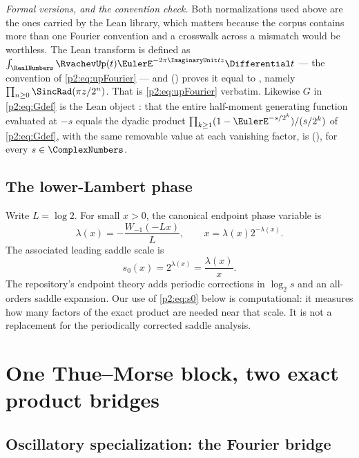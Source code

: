 \documentclass[11pt,oneside]{article}
\numberwithin{equation}{section}
\theoremstyle{definition}
\theoremstyle{remark}
\begin{document}
\emph{Formal versions, and the convention check.}  Both normalizations used above are the ones
carried by the Lean library, which matters because the corpus contains more than one Fourier
convention and a crosswalk across a mismatch would be worthless.  The Lean transform
 is defined as $\int_\RealNumbers\RvachevUp(t)\EulerE^{-2\pi\ImaginaryUnit tz}\Differential t$ --- the
convention of \eqref{p2:eq:upFourier} --- and
 () proves it equal to
, namely $\prod_{n\ge0}\SincRad(\pi z/2^n)$.  That is
\eqref{p2:eq:upFourier} verbatim.  Likewise $G$ in \eqref{p2:eq:Gdef} is the Lean object
: that the entire half-moment generating function
evaluated at $-s$ equals the dyadic product $\prod_{k\ge1}(1-\EulerE^{-s/2^k})/(s/2^k)$ of
\eqref{p2:eq:Gdef}, with the same removable value at each vanishing factor, is
(), for every $s\in\ComplexNumbers$.

\subsection{The lower-Lambert phase}

Write $L=\log2$.  For small $x>0$, the canonical endpoint phase variable is
\begin{equation}
 \lambda(x)=-\frac{W_{-1}(-Lx)}{L},
 \qquad x=\lambda(x)2^{-\lambda(x)}.
 \label{p2:eq:lambda}
\end{equation}
The associated leading saddle scale is
\begin{equation}
 s_0(x)=2^{\lambda(x)}=\frac{\lambda(x)}{x}.
 \label{p2:eq:s0}
\end{equation}
The repository's endpoint theory adds periodic corrections in $\log_2s$ and an all-orders
saddle expansion.  Our use of \eqref{p2:eq:s0} below is computational: it measures how many
factors of the exact product are needed near that scale.  It is not a replacement for the
periodically corrected saddle analysis.

\section{One Thue--Morse block, two exact product bridges}
\label{p2:sec:bridges}

\subsection{Oscillatory specialization: the Fourier bridge}
\end{document}
